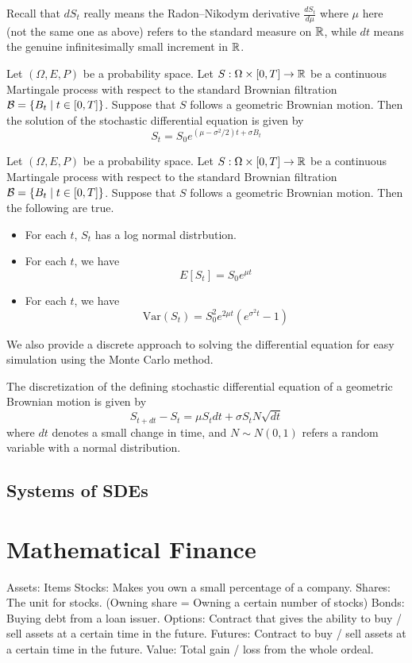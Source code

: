 \documentclass[a4paper]{article}
\begin{document}
Recall that $dS_t$ really means the Radon–Nikodym derivative $\frac{dS_t}{d\mu}$ where $\mu$ here (not the same one as above) refers to the standard measure on $\mathbb{R}$, while $dt$ means the genuine infinitesimally small increment in $\mathbb{R}$. 

\begin{lmm}{}{} Let $(\Omega,E,P)$ be a probability space. Let $S:\Omega\times[0,T]\to\mathbb{R}$ be a continuous Martingale process with respect to the standard Brownian filtration $\mathcal{B}=\{B_t\;|\;t\in[0,T]\}$. Suppose that $S$ follows a geometric Brownian motion. Then the solution of the stochastic differential equation is given by $$S_t=S_0e^{(\mu-\sigma^2/2)t+\sigma B_t}$$
\end{lmm}

\begin{prp}{}{} Let $(\Omega,E,P)$ be a probability space. Let $S:\Omega\times[0,T]\to\mathbb{R}$ be a continuous Martingale process with respect to the standard Brownian filtration $\mathcal{B}=\{B_t\;|\;t\in[0,T]\}$. Suppose that $S$ follows a geometric Brownian motion. Then the following are true. 
\begin{itemize}
\item For each $t$, $S_t$ has a log normal distrbution. 
\item For each $t$, we have $$E[S_t]=S_0e^{\mu t}$$
\item For each $t$, we have $$\text{Var}(S_t)=S_0^2e^{2\mu t}(e^{\sigma^2 t}-1)$$
\end{itemize}
\end{prp}

We also provide a discrete approach to solving the differential equation for easy simulation using the Monte Carlo method. 

\begin{prp}{}{} The discretization of the defining stochastic differential equation of a geometric Brownian motion is given by $$S_{t+dt}-S_t=\mu S_tdt+\sigma S_tN\sqrt{dt}$$ where $dt$ denotes a small change in time, and $N\sim N(0,1)$ refers a random variable with a normal distribution. 
\end{prp}

\subsection{Systems of SDEs}

\pagebreak
\section{Mathematical Finance}
Assets: Items
Stocks: Makes you own a small percentage of a company. 
Shares: The unit for stocks. (Owning share = Owning a certain number of stocks)
Bonds: Buying debt from a loan issuer. 
Options: Contract that gives the ability to buy / sell assets at a certain time in the future. 
Futures: Contract to buy / sell assets at a certain time in the future. 
Value: Total gain / loss from the whole ordeal. 
\end{document}
